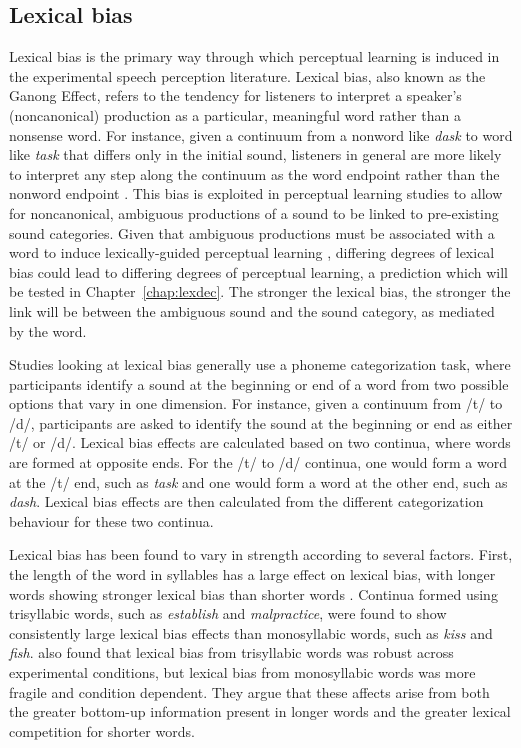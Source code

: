 \subsection{Lexical bias}
\label{sec:lexicalbias}

Lexical bias is the primary way through which perceptual learning is induced in the experimental speech perception literature.
Lexical bias, also known as the Ganong Effect, refers to the tendency for listeners to interpret a speaker's (noncanonical) production as a particular, meaningful word rather than a nonsense word.  
For instance, given a continuum from a nonword like \emph{dask} to word like \emph{task} that differs only in the initial sound, listeners in general are more likely to interpret any step along the continuum as the word endpoint rather than the nonword endpoint \citep{Ganong1980}. 
This bias is exploited in perceptual learning studies to allow for noncanonical, ambiguous productions of a sound to be linked to pre-existing sound categories.
Given that ambiguous productions must be associated with a word to induce lexically-guided perceptual learning \citep{Norris2003}, differing degrees of lexical bias could lead to differing degrees of perceptual learning, a prediction which will be tested in Chapter~\ref{chap:lexdec}.  
The stronger the lexical bias, the stronger the link will be between the ambiguous sound and the sound category, as mediated by the word.

Studies looking at lexical bias generally use a phoneme categorization task, where participants identify a sound at the beginning or end of a word from two possible options that vary in one dimension.  
For instance, given a continuum from /t/ to /d/, participants are asked to identify the sound at the beginning or end as either /t/ or /d/. 
Lexical bias effects are calculated based on two continua, where words are formed at opposite ends. 
For the /t/ to /d/ continua, one would form a word at the /t/ end, such as \emph{task} and one would form a word at the other end, such as \emph{dash}.  
Lexical bias effects are then calculated from the different categorization behaviour for these two continua.

Lexical bias has been found to vary in strength according to several factors.  
First, the length of the word in syllables has a large effect on lexical bias, with longer words showing stronger lexical bias than shorter words \citep{Pitt2006}.  
Continua formed using trisyllabic words, such as \emph{establish} and \emph{malpractice}, were found to show consistently large lexical bias effects than monosyllabic words, such as \emph{kiss} and \emph{fish}.  
\citet{Pitt2006} also found that lexical bias from trisyllabic words was robust across experimental conditions, but lexical bias from monosyllabic words was more fragile and condition dependent.  
They argue that these affects arise from both the greater bottom-up information present in longer words and the greater lexical competition for shorter words.

